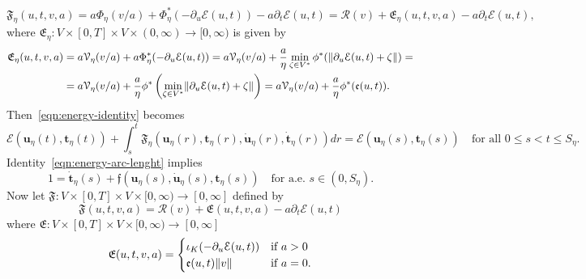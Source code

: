 \[
\mathfrak{F}_\eta(u,t,v,a)=a\Phi_\eta(v/a)+\Phi_\eta^*(-\partial_u\mathcal{E}(u,t))-a\partial_t\mathcal{E}(u,t)=\mathcal{R}(v)+\mathfrak{E}_\eta(u,t,v,a)-a\partial_t\mathcal{E}(u,t),
\]
where $\mathfrak{E}_\eta\colon V\times[0,T]\times V\times(0,\infty)\to[0,\infty)$ is given by
\[
\begin{split}
\mathfrak{E}_\eta(u,t,v,a)&=a\mathcal{V}_\eta(v/a)+a\Phi_\eta^*(-\partial_u\mathcal{E}(u,t))=a\mathcal{V}_\eta(v/a)+\frac{a}{\eta}\min_{\zeta\in V^*}\phi^*(\lVert\partial_u\mathcal{E}(u,t)+\zeta\rVert)=\\
&=a\mathcal{V}_\eta(v/a)+\frac{a}{\eta}\phi^*\left(\min_{\zeta\in V^*}\lVert\partial_u\mathcal{E}(u,t)+\zeta\rVert\right)=a\mathcal{V}_\eta(v/a)+\frac{a}{\eta}\phi^*(\mathfrak{e}(u,t)).
\end{split}
\]
Then~\eqref{eqn:energy-identity} becomes
\begin{equation*}
\mathcal{E}(\boldsymbol{u}_\eta(t),\boldsymbol{t}_\eta(t))+\int_s^t\mathfrak{F}_\eta(\boldsymbol{u}_\eta(r),\boldsymbol{t}_\eta(r),\dot{\boldsymbol{u}}_\eta(r),\dot{\boldsymbol{t}}_\eta(r))dr=\mathcal{E}(\boldsymbol{u}_\eta(s),\boldsymbol{t}_\eta(s))\quad\text{for all $0\le s<t\le S_\eta$}.
\end{equation*}
Identity~\eqref{eqn:energy-arc-lenght} implies
\begin{equation}
\label{eqn:normalization-rescaling}
1=\dot{\boldsymbol{t}}_\eta(s)+\mathfrak{f}(\boldsymbol{u}_\eta(s),\dot{\boldsymbol{u}}_\eta(s),\boldsymbol{t}_\eta(s))\quad\text{for a.e.\ $s\in(0,S_\eta)$}.
\end{equation}
Now let $\mathfrak{F}\colon V\times[0,T]\times V\times[0,\infty)\to[0,\infty]$ defined by
\[
\mathfrak{F}(u,t,v,a)=\mathcal{R}(v)+\mathfrak{E}(u,t,v,a)-a\partial_t\mathcal{E}(u,t)
\]
where $\mathfrak{E}\colon V\times[0,T]\times V\times[0,\infty)\to[0,\infty]$
\[
\mathfrak{E}(u,t,v,a)=
\begin{cases}
\iota_K(-\partial_u\mathcal{E}(u,t)) & \text{if $a>0$} \\
\mathfrak{e}(u,t)\lVert v\rVert & \text{if $a=0$}.
\end{cases}
\]
